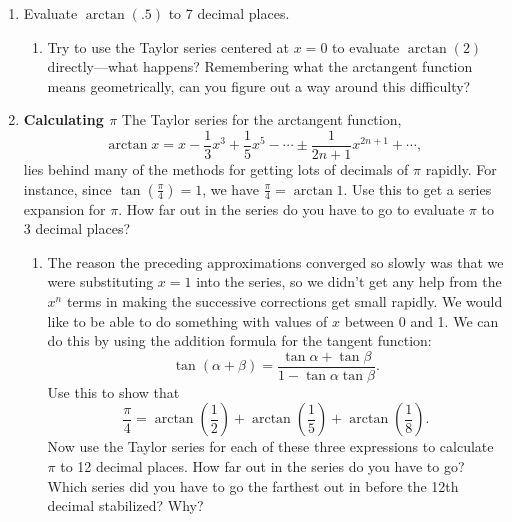 \begin{enumerate}
\begin{enumerate}


  \item Find the Taylor series centered at $u=0$ for
\[
\ln\left( \dfrac{1-u}{1+u} \right).
\]
(Remember that $\ln(A/B) = \ln{A} - \ln{B}$.)


  \item Show that {\em any} $x>0$ can be written in the form
$(1-u)/(1+u)$ for some suitable $-1<u<1$.

  \item Use the preceding to evaluate $\ln{5}$ to 7 decimal places. How
far out in the Taylor series did you have to go?


\end{enumerate}
\item Evaluate $\arctan(.5)$ to 7 decimal places.

  \begin{enumerate}
  \item Try to use the
Taylor series centered at $x=0$ to evaluate $\arctan(2)$
directly---what happens?  Remembering what the arctangent function
means geometrically, can you figure out a way around this difficulty?


\end{enumerate}
\item {\bf Calculating $\pi$} \quad The
Taylor series for the arctangent function,
\[
\arctan{x} = x - \dfrac{1}{3}x^3 + \dfrac{1}{5} x^5 - \cdots 
       \pm \dfrac{1}{{2n+1}} x^{2n+1} + \cdots ,
\]
lies behind many of the methods for getting lots of decimals of $\pi$
rapidly.  For instance, since $\tan\left(\tfrac{\pi}{4}\right) = 1$, we have
$\tfrac{\pi}{4} = \arctan{1}$.  Use this to get a series expansion for
$\pi$.  How far out in the series do you have to go to evaluate $\pi$
to 3 decimal places?



  \begin{enumerate}
  \item The reason the preceding approximations converged so slowly was
that we were substituting $x=1$ into the series, so we didn't get any
help from the $x^n$ terms in making the successive corrections get
small rapidly.  We would like to be able to do something with values
of $x$ between 0 and 1.  We can do this by using the addition formula
for the tangent function:
\[
\tan(\alpha + \beta ) = \dfrac{{\tan\alpha +\tan\beta}}
    {1 - \tan\alpha \tan\beta}.
\]
Use this to show that
\[
\dfrac{\pi}{4} 
  = \arctan{\left(\dfrac{1}{2}\right)}
    + \arctan{\left(\dfrac{1}{5}\right)} 
    + \arctan{\left(\dfrac{1}{8}\right)}.
\]
Now use the Taylor series for each of these three expressions to
calculate $\pi$ to 12 decimal places.  How far out in the series do
you have to go?  Which series did you have to go the farthest out in
before the 12th decimal stabilized? Why?



\end{enumerate}
\end{enumerate}
